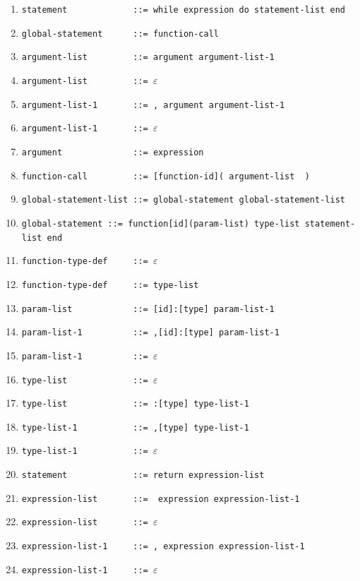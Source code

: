 \documentclass[11pt]{article}
\begin{document}
\begin{enumerate}[noitemsep]
            \item\verb|statement             ::= while expression do statement-list end| 
            \item\verb|global-statement      ::= function-call| 
            \item\verb|argument-list         ::= argument argument-list-1| 
            \item\verb|argument-list         ::= |$\varepsilon$ 
            \item\verb|argument-list-1       ::= , argument argument-list-1| 
            \item\verb|argument-list-1       ::= |$\varepsilon$ 
            \item\verb|argument              ::= expression| 
            \item\verb|function-call         ::= [function-id]( argument-list  )| 
            \item\verb|global-statement-list ::= global-statement global-statement-list| 
            \item\verb|global-statement ::= function[id](param-list) type-list statement-list end| 
            \item\verb|function-type-def     ::= |$\varepsilon$ 
            \item\verb|function-type-def     ::= type-list| 
            \item\verb|param-list            ::= [id]:[type] param-list-1| 
            \item\verb|param-list-1          ::= ,[id]:[type] param-list-1| 
            \item\verb|param-list-1          ::= |$\varepsilon$ 
            \item\verb|type-list             ::= |$\varepsilon$ 
            \item\verb|type-list             ::= :[type] type-list-1| 
            \item\verb|type-list-1           ::= ,[type] type-list-1| 
            \item\verb|type-list-1           ::= |$\varepsilon$ 
            \item\verb|statement             ::= return expression-list| 
            \item\verb|expression-list       ::=  expression expression-list-1| 
            \item\verb|expression-list       ::= |$\varepsilon$ 
            \item\verb|expression-list-1     ::= , expression expression-list-1| 
            \item\verb|expression-list-1     ::= |$\varepsilon$  \end{enumerate}
            \pagebreak
  
\end{document}
